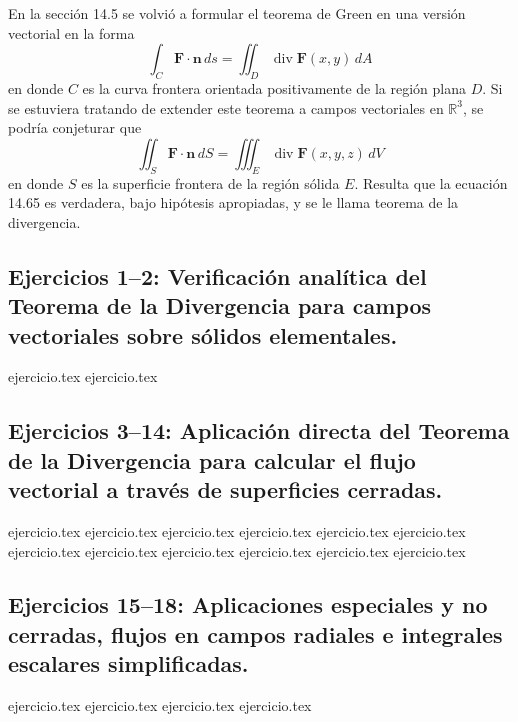 
En la sección 14.5 se volvió a formular el teorema de Green en una versión vectorial en la forma
\[ \int_C \mathbf{F} \cdot \mathbf{n} \, ds = \iint_D \operatorname{div} \mathbf{F}(x, y) \, dA \]
en donde $C$ es la curva frontera orientada positivamente de la región plana $D$. Si se estuviera tratando de extender este teorema a campos vectoriales en $\mathbb{R}^3$, se podría conjeturar que
\begin{equation}
\iint_S \mathbf{F} \cdot \mathbf{n} \, dS = \iiint_E \operatorname{div} \mathbf{F}(x, y, z) \, dV \tag{14.65}
\end{equation}
en donde $S$ es la superficie frontera de la región sólida $E$. Resulta que la ecuación 14.65 es verdadera, bajo hipótesis apropiadas, y se le llama teorema de la divergencia.

\bigskip

\subsection*{Ejercicios 1--2: Verificación analítica del Teorema de la Divergencia para campos vectoriales sobre sólidos elementales.}
\begin{enumerate}
    {ejercicio.tex}
    {ejercicio.tex}
\end{enumerate}

\subsection*{Ejercicios 3--14: Aplicación directa del Teorema de la Divergencia para calcular el flujo vectorial a través de superficies cerradas.}
\begin{enumerate}
    \setcounter{enumi}{2}
    {ejercicio.tex}
    {ejercicio.tex}
    {ejercicio.tex}
    {ejercicio.tex}
    {ejercicio.tex}
    {ejercicio.tex}
    {ejercicio.tex}
    {ejercicio.tex}
    {ejercicio.tex}
    {ejercicio.tex}
    {ejercicio.tex}
    {ejercicio.tex}
\end{enumerate}

\subsection*{Ejercicios 15--18: Aplicaciones especiales y no cerradas, flujos en campos radiales e integrales escalares simplificadas.}
\begin{enumerate}
    \setcounter{enumi}{14}
    {ejercicio.tex}
    {ejercicio.tex}
    {ejercicio.tex}
    {ejercicio.tex}
\end{enumerate}


